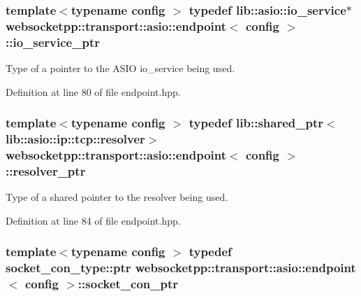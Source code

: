 \subsubsection[{io\+\_\+service\+\_\+ptr}]{\setlength{\rightskip}{0pt plus 5cm}template$<$typename config $>$ typedef lib\+::asio\+::io\+\_\+service$\ast$ {\bf websocketpp\+::transport\+::asio\+::endpoint}$<$ config $>$\+::{\bf io\+\_\+service\+\_\+ptr}}\label{classwebsocketpp_1_1transport_1_1asio_1_1endpoint_acc7e89c6427514628f551cf3f795b7e0}


Type of a pointer to the A\+S\+I\+O io\+\_\+service being used. 



Definition at line 80 of file endpoint.\+hpp.

\hypertarget{classwebsocketpp_1_1transport_1_1asio_1_1endpoint_aff1899396fa9d1439e00ca53c56676a5}{}
\subsubsection[{resolver\+\_\+ptr}]{\setlength{\rightskip}{0pt plus 5cm}template$<$typename config $>$ typedef lib\+::shared\+\_\+ptr$<$lib\+::asio\+::ip\+::tcp\+::resolver$>$ {\bf websocketpp\+::transport\+::asio\+::endpoint}$<$ config $>$\+::{\bf resolver\+\_\+ptr}}\label{classwebsocketpp_1_1transport_1_1asio_1_1endpoint_aff1899396fa9d1439e00ca53c56676a5}


Type of a shared pointer to the resolver being used. 



Definition at line 84 of file endpoint.\+hpp.

\hypertarget{classwebsocketpp_1_1transport_1_1asio_1_1endpoint_a74fb719ac5393b320d98b77f346a4b34}{}
\subsubsection[{socket\+\_\+con\+\_\+ptr}]{\setlength{\rightskip}{0pt plus 5cm}template$<$typename config $>$ typedef socket\+\_\+con\+\_\+type\+::ptr {\bf websocketpp\+::transport\+::asio\+::endpoint}$<$ config $>$\+::{\bf socket\+\_\+con\+\_\+ptr}}\label{classwebsocketpp_1_1transport_1_1asio_1_1endpoint_a74fb719ac5393b320d98b77f346a4b34}


